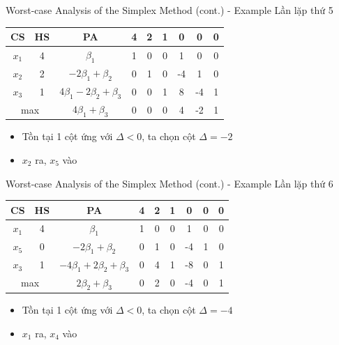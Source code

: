 \documentclass[10pt]{beamer}
\begin{document}
\begin{frame}{Worst-case Analysis of the Simplex Method (cont.) - Example}
Lần lặp thứ 5
\begin{table}[H]
\centering
\begin{tabular}{|c|c|c|c|c|c|c|c|c|}
\hline
CS & HS & PA & 4 & 2 & 1 & 0 & 0 & 0 \\
\hline
$x_1$ & 4 & $\beta_1$ & 1 & 0 & 0 & 1 & 0 & 0 \\
$x_2$ & 2 & $-2\beta_1 + \beta_2$ & 0 & 1 & 0 & -4 & 1 & 0 \\
$x_3$ & 1 & $4\beta_1 - 2\beta_2 + \beta_3$ & 0 & 0 & 1 & 8 & -4 & 1 \\
\hline
\multicolumn{2}{|c|}{max}
& $4\beta_1 + \beta_3$ & 0 & 0 & 0 & 4 & -2 & 1 \\
\hline
\end{tabular}
\end{table}
\begin{itemize}
\item Tồn tại 1 cột ứng với $\Delta < 0$, ta chọn cột $\Delta = -2$
\item $x_2$ ra, $x_5$ vào
\end{itemize}
\end{frame}

\begin{frame}{Worst-case Analysis of the Simplex Method (cont.) - Example}
Lần lặp thứ 6
\begin{table}[H]
\centering
\begin{tabular}{|c|c|c|c|c|c|c|c|c|}
\hline
CS & HS & PA & 4 & 2 & 1 & 0 & 0 & 0 \\
\hline
$x_1$ & 4 & $\beta_1$ & 1 & 0 & 0 & 1 & 0 & 0 \\
$x_5$ & 0 & $-2\beta_1 + \beta_2$ & 0 & 1 & 0 & -4 & 1 & 0 \\
$x_3$ & 1 & $-4\beta_1 + 2\beta_2 + \beta_3$ & 0 & 4 & 1 & -8 & 0 & 1 \\
\hline
\multicolumn{2}{|c|}{max}
& $2\beta_2 + \beta_3$ & 0 & 2 & 0 & -4 & 0 & 1 \\
\hline
\end{tabular}
\end{table}
\begin{itemize}
\item Tồn tại 1 cột ứng với $\Delta < 0$, ta chọn cột $\Delta = -4$
\item $x_1$ ra, $x_4$ vào
\end{itemize}
\end{frame}
\end{document}
